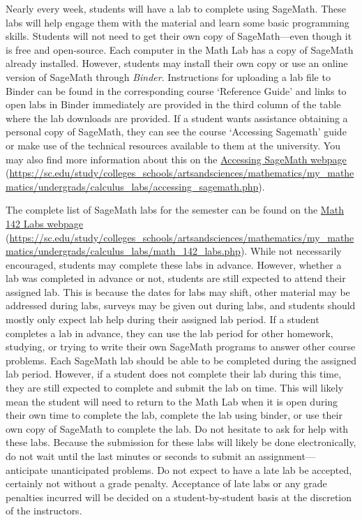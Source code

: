 \documentclass[11pt,letterpaper]{article}
\begin{document}
Nearly every week, students will have a lab to complete using SageMath. These labs will help engage them with the material and learn some basic programming skills. Students will not need to get their own copy of SageMath---even though it is free and open-source. Each computer in the Math Lab has a copy of SageMath already installed. However, students may install their own copy or use an online version of SageMath through \textit{Binder}. Instructions for uploading a lab file to Binder can be found in the corresponding course `Reference Guide' and links to open labs in Binder immediately are provided in the third column of the table where the lab downloads are provided. If a student wants assistance obtaining a personal copy of SageMath, they can see the course `Accessing Sagemath' guide or make use of the technical resources available to them at the university. You may also find more information about this on the \href{https://sc.edu/study/colleges\_schools/artsandsciences/mathematics/my\_mathematics/undergrads/calculus\_labs/accessing\_sagemath.php}{Accessing SageMath webpage} (\url{https://sc.edu/study/colleges\_schools/artsandsciences/mathematics/my\_mathematics/undergrads/calculus\_labs/accessing\_sagemath.php}). \pspace

The complete list of SageMath labs for the semester can be found on the \href{https://sc.edu/study/colleges\_schools/artsandsciences/mathematics/my\_mathematics/undergrads/calculus\_labs/math\_142\_labs.php}{Math 142 Labs webpage} (\url{https://sc.edu/study/colleges\_schools/artsandsciences/mathematics/my\_mathematics/undergrads/calculus\_labs/math\_142\_labs.php}). While not necessarily encouraged, students may complete these labs in advance. However, whether a lab was completed in advance or not, students are still expected to attend their assigned lab. This is because the dates for labs may shift, other material may be addressed during labs, surveys may be given out during labs, and students should mostly only expect lab help during their assigned lab period. If a student completes a lab in advance, they can use the lab period for other homework, studying, or trying to write their own SageMath programs to answer other course problems. Each SageMath lab should be able to be completed during the assigned lab period. However, if a student does not complete their lab during this time, they are still expected to complete and submit the lab on time. This will likely mean the student will need to return to the Math Lab when it is open during their own time to complete the lab, complete the lab using binder, or use their own copy of SageMath to complete the lab. Do not hesitate to ask for help with these labs. Because the submission for these labs will likely be done electronically, do not wait until the last minutes or seconds to submit an assignment---anticipate unanticipated problems. Do not expect to have a late lab be accepted, certainly not without a grade penalty. Acceptance of late labs or any grade penalties incurred will be decided on a student-by-student basis at the discretion of the instructors. 
\sectionbreak
\end{document}
